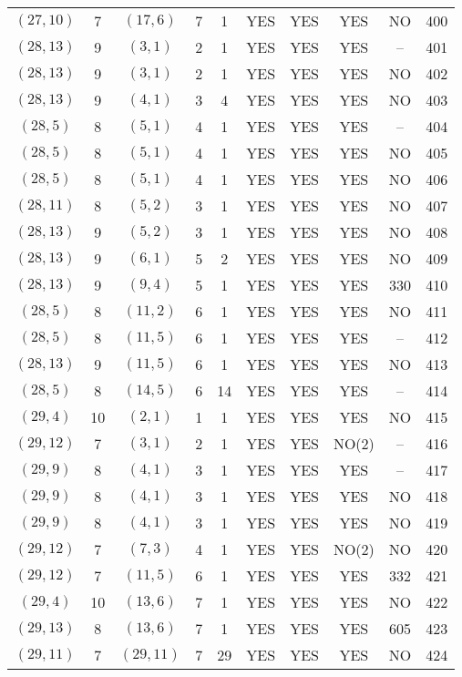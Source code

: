 \begin{longtable}{|c|c|c|c|c|c|c|c|c|c|}
$(27, 10)$ & 7 & $(17, 6)$ & 7 & 1 & YES & YES & YES & NO & 400\\
$(28, 13)$ & 9 & $(3, 1)$ & 2 & 1 & YES & YES & YES & -- & 401\\
$(28, 13)$ & 9 & $(3, 1)$ & 2 & 1 & YES & YES & YES & NO & 402\\
$(28, 13)$ & 9 & $(4, 1)$ & 3 & 4 & YES & YES & YES & NO & 403\\
$(28, 5)$ & 8 & $(5, 1)$ & 4 & 1 & YES & YES & YES & -- & 404\\
$(28, 5)$ & 8 & $(5, 1)$ & 4 & 1 & YES & YES & YES & NO & 405\\
$(28, 5)$ & 8 & $(5, 1)$ & 4 & 1 & YES & YES & YES & NO & 406\\
$(28, 11)$ & 8 & $(5, 2)$ & 3 & 1 & YES & YES & YES & NO & 407\\
$(28, 13)$ & 9 & $(5, 2)$ & 3 & 1 & YES & YES & YES & NO & 408\\
$(28, 13)$ & 9 & $(6, 1)$ & 5 & 2 & YES & YES & YES & NO & 409\\
$(28, 13)$ & 9 & $(9, 4)$ & 5 & 1 & YES & YES & YES & 330 & 410\\
$(28, 5)$ & 8 & $(11, 2)$ & 6 & 1 & YES & YES & YES & NO & 411\\
$(28, 5)$ & 8 & $(11, 5)$ & 6 & 1 & YES & YES & YES & -- & 412\\
$(28, 13)$ & 9 & $(11, 5)$ & 6 & 1 & YES & YES & YES & NO & 413\\
$(28, 5)$ & 8 & $(14, 5)$ & 6 & 14 & YES & YES & YES & -- & 414\\
$(29, 4)$ & 10 & $(2, 1)$ & 1 & 1 & YES & YES & YES & NO & 415\\
$(29, 12)$ & 7 & $(3, 1)$ & 2 & 1 & YES & YES & NO(2) & -- & 416\\
$(29, 9)$ & 8 & $(4, 1)$ & 3 & 1 & YES & YES & YES & -- & 417\\
$(29, 9)$ & 8 & $(4, 1)$ & 3 & 1 & YES & YES & YES & NO & 418\\
$(29, 9)$ & 8 & $(4, 1)$ & 3 & 1 & YES & YES & YES & NO & 419\\
$(29, 12)$ & 7 & $(7, 3)$ & 4 & 1 & YES & YES & NO(2) & NO & 420\\
$(29, 12)$ & 7 & $(11, 5)$ & 6 & 1 & YES & YES & YES & 332 & 421\\
$(29, 4)$ & 10 & $(13, 6)$ & 7 & 1 & YES & YES & YES & NO & 422\\
$(29, 13)$ & 8 & $(13, 6)$ & 7 & 1 & YES & YES & YES & 605 & 423\\
$(29, 11)$ & 7 & $(29, 11)$ & 7 & 29 & YES & YES & YES & NO & 424\\

\end{longtable}
